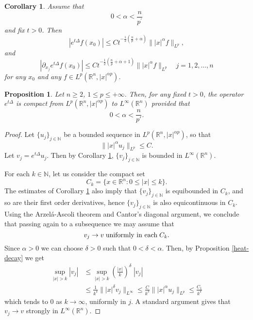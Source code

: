 \documentclass[12pt]{amsart}
\newcommand {\N}{\mathbb{N}}
\newcommand {\R}{\mathbb{R}}
\newtheorem{corollary}[theorem]{Corollary}
\newtheorem{proposition}[theorem]{Proposition}
\begin{document}
\begin{corollary} \label{prop2}
Assume that
$$ 0< \alpha < \frac{n}{p^\prime}$$ 
and fix $t>0$. Then
\begin{equation} \label{ecc.1}
 |e^{t\Delta} f(x_0)| \leq C t^{-\frac12 (\frac{n}{p}+\alpha)} \| |x|^\alpha f \|_{L^p} ,
\end{equation}
and
\begin{equation} \label{ecc.2}
 | \partial_{x_j} e^{t\Delta} f(x_0)| \leq C t^{-\frac12 (\frac{n}{p}+\alpha+1)} \| |x|^\alpha f \|_{L^p} \quad j=1,2,\ldots, n 
\end{equation}
for any $x_0$ and any $f \in L^p(\R^n,|x|^{\alpha p})$.
\end{corollary}


\begin{proposition}\label{prop.simple}
	\label{compactness-heat-kernel}
	Let $n\geq 2$, $1 \le p  \le +\infty$. Then, for any fixed $t>0$, the operator $e^{t\Delta}$ is compact from $L^p(\R^n,|x|^{\alpha p})$ to $L^\infty(\R^n)$ provided that
	\begin{equation}
	0<\alpha<\frac{n}{p'}.
	\end{equation}
\end{proposition}




\begin{proof}
	Let $\{u_j\}_{j\in\N}$ be a bounded sequence in $L^p(\R^n,|x|^{\alpha p})$, so that
	$$ \| |x|^\alpha u_j \|_{L^p} \leq  C.$$
	Let $v_j= e^{t \Delta} u_j$. Then by Corollary \ref{prop2}, $\{v_j\}_{j\in\N}$ is bounded in $L^\infty(\R^n)$. 
	
	For each $k \in \N$, let us consider the compact set
	$$ C_{k} = \{ x \in \R^n : 0 \leq |x| \leq k \}. $$
	The estimates of Corollary \ref{prop2} also  imply that $\{v_j\}_{j\in\N}$ is equibounded in $C_k$, and so are 
	their first order derivatives, hence $\{v_j\}_{j\in\N}$ is also equicontinuous in $C_k$. Using the Arzel\'a-Ascoli theorem and Cantor's diagonal argument, we conclude that passing 
	again to a subsequence we may assume that
	$$ v_j \to v \; \hbox{uniformly in each} \; C_k. $$
	Since $\alpha>0$ we can choose  $\delta>0$ such that $0<\delta<\alpha$.
	Then, by Proposition \ref{heat-decay} we get
	\begin{align*}
	\sup_{|x|>k} |v_j|  & \leq  \sup_{|x|>k} \left(\frac{|x|}{k}\right)^\delta \;  |v_j|   \\
	&\leq \frac{1}{k^\delta}   \| |x|^\delta v_j  \|_{L^\infty}
	\leq \frac{C}{k^\delta}  \| |x|^\alpha u_j \|_{L^p} \leq \frac{C_1}{k^\delta}
	\end{align*}
	which tends to $0$ as $k \to \infty$, uniformly in $j$. A standard argument gives that $v_j \to v$ strongly in $L^\infty(\R^n)$.
	
\end{proof}
\end{document}
